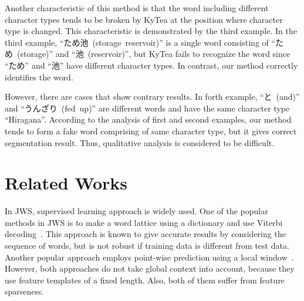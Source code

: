 \documentclass[11pt,letterpaper]{article}
\begin{document}
Another characteristic of this method is that the word including different character types tends to be broken by KyTea at the position where character type is changed. This characteristic is demonstrated by the third example. In the third example, \mbox{``ため池 (storage reservoir)''} is a single word consisting of \mbox{``ため (storage)''} and \mbox{``池 (reservoir)''}, but KyTea fails to recognize the word since \mbox{``ため''} and \mbox{``池''} have different character types. In contrast, our method correctly identifies the word.

However, there are cases that show contrary results. In forth example, \mbox{``と (and)''} and \mbox{``うんざり (fed up)''} are different words and have the same character type \mbox{``Hiragana''}. According to the analysis of first and second examples, our method tends to form a fake word comprising of same character type, but it gives correct segmentation result. Thus, qualitative analysis is considered to be difficult.








\section{Related Works}
\label{sec:relatedworks}

In JWS, supervised learning approach is widely used. One of the popular methods in JWS is to make a word lattice using a dictionary and use Viterbi decoding~\cite{kudo-yamamoto-matsumoto:2004:EMNLP,sassano2002empirical}. This approach is known to give accurate results by considering the sequence of words, but is not robust if training data is different from test data. Another popular approach employs point-wise prediction using a local window~\cite{neubig-nakata-mori:2011:ACL-HLT2011,NEUBIG10.408}. However, both approaches do not take global context into account, because they use feature templates of a fixed length. Also, both of them suffer from feature sparseness.
\end{document}

